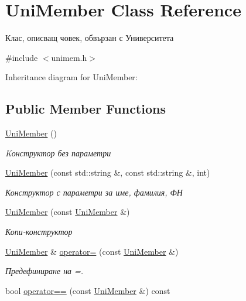 \hypertarget{class_uni_member}{}\section{Uni\+Member Class Reference}
\label{class_uni_member}


Клас, описващ човек, обвързан с Университета  




{\ttfamily \#include $<$unimem.\+h$>$}



Inheritance diagram for Uni\+Member\+:
\subsection*{Public Member Functions}
\begin{DoxyCompactItemize}
\item 
\hyperlink{class_uni_member_a421f3bbcb1c24efda7d9db2817115c11}{Uni\+Member} ()
\begin{DoxyCompactList}\small\item\em Kонструктор без параметри \end{DoxyCompactList}\item 
\hyperlink{class_uni_member_acb2e9cc54f0e8460d9db7f764966bbf3}{Uni\+Member} (const std\+::string \&, const std\+::string \&, int)
\begin{DoxyCompactList}\small\item\em Конструктор с параметри за име, фамилия, ФН \end{DoxyCompactList}\item 
\hyperlink{class_uni_member_a3a13cd99a8ccb8349350728bbb5db627}{Uni\+Member} (const \hyperlink{class_uni_member}{Uni\+Member} \&)
\begin{DoxyCompactList}\small\item\em Копи-\/конструктор \end{DoxyCompactList}\item 
\hyperlink{class_uni_member}{Uni\+Member} \& \hyperlink{class_uni_member_a7f2686113c609f487896e7bc57bd3d94}{operator=} (const \hyperlink{class_uni_member}{Uni\+Member} \&)
\begin{DoxyCompactList}\small\item\em Предефиниране на =. \end{DoxyCompactList}\item 
bool \hyperlink{class_uni_member_abb98661e8d9950b55b3f647d0c9656f7}{operator==} (const \hyperlink{class_uni_member}{Uni\+Member} \&) const

\end{DoxyCompactItemize}

